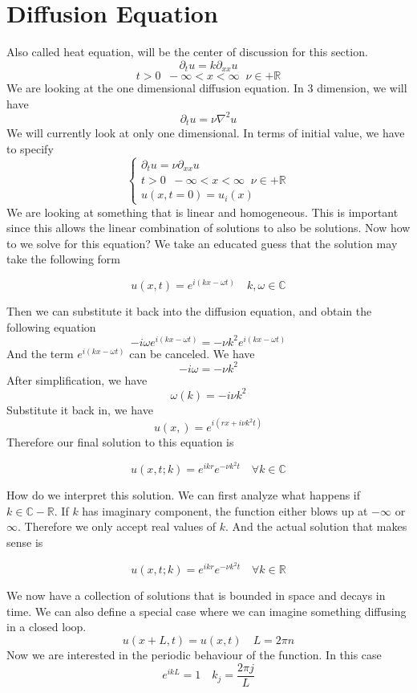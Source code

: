 \documentclass[12pt]{book}
\newcommand{\R}{\mathbb{R}}
\newcommand{\C}{\mathbb{C}}
\begin{document}
\section{Diffusion Equation}
Also called heat equation, will be the center of discussion for this section.
\[
\partial_t u = k\partial_{xx}u
\]
\[
t>0\;\; -\infty < x <\infty \;\; \nu\in +\R
\]
We are looking at the one dimensional diffusion equation. In 3 dimension, we will have
\[
\partial_t u = \nu\nabla^2u
\]
We will currently look at only one dimensional. In terms of initial value, we have to specify
\[
\begin{cases}
    \partial_t u = \nu\partial_{xx}u\\
    t>0\;\; -\infty < x <\infty \;\; \nu\in +\R\\
    u(x,t=0) = u_i(x)
\end{cases}
\]
We are looking at something that is linear and homogeneous. This is important since this allows the linear combination of solutions to also be solutions. Now how to we solve for this equation? We take an educated guess that the solution may take the following form
\begin{large}
\[
u(x,t) = e^{i(kx-\omega t)} \quad k,\omega \in \C
\]
\end{large}
Then we can substitute it back into the diffusion equation, and obtain the following equation
\[
-i\omega e^{i(kx-\omega t)} = -\nu k^2 e^{i(kx-\omega t)}
\]
And the term $e^{i(kx-\omega t)}$ can be canceled. We have
\[
-i\omega = -\nu k^2
\]
After simplification, we have
\[
\omega(k) = -i\nu k^2
\]
Substitute it back in, we have
    \[
    u(x,) = e^{i(rx+i\nu k^2 t)}
    \]
Therefore our final solution to this equation is
\begin{large}
    \[
    u(x,t;k) = e^{ikr}e^{-\nu k^2 t} \quad \forall k \in \C
    \]
\end{large}
How do we interpret this solution. We can first analyze what happens if $k \in \C - \R$. If $k$ has imaginary component, the function either blows up at $-\infty$ or $\infty$. Therefore we only accept real values of $k$. And the actual solution that makes sense is
\begin{large}
    \[
    u(x,t;k) = e^{ikr}e^{-\nu k^2 t} \quad \forall k \in \R
    \]
\end{large}
We now have a collection of solutions that is bounded in space and decays in time. We can also define a special case where we can imagine something diffusing in a closed loop.
\[
u(x+L,t) = u(x,t) \quad L = 2\pi n
\]
Now we are interested in the periodic behaviour of the function. In this case
\[
e^{ikL} = 1 \quad k_j = \frac{2\pi j}{L}
\]
\end{document}

